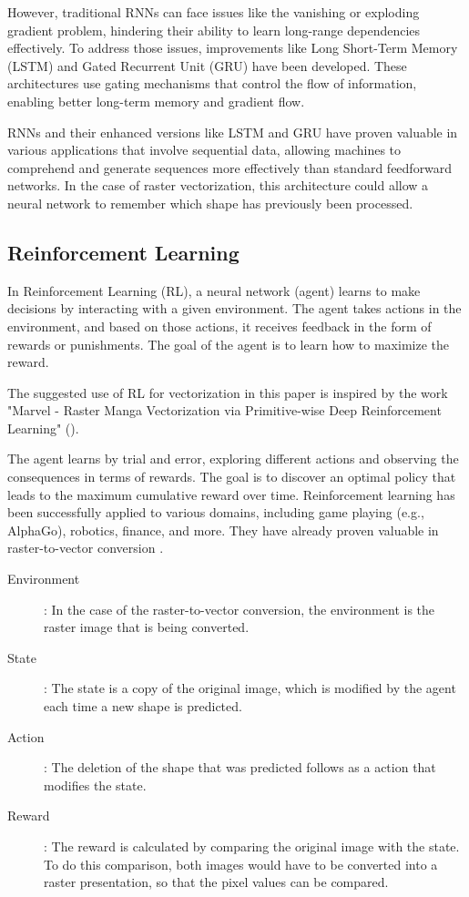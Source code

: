 \documentclass[12pt, a4paper, titlepage]{report}
\begin{document}
However, traditional RNNs can face issues like the vanishing or exploding gradient problem, hindering their ability to learn long-range dependencies effectively.
To address those issues, improvements like Long Short-Term Memory (LSTM) and Gated Recurrent Unit (GRU) have been developed. These architectures use gating mechanisms that control the flow of information, enabling better long-term memory and gradient flow.

RNNs and their enhanced versions like LSTM and GRU have proven valuable in various applications that involve sequential data, allowing machines to comprehend and generate sequences more effectively than standard feedforward networks. In the case of raster vectorization, this architecture could allow a neural network to remember which shape has previously been processed.

\subsection{Reinforcement Learning}

In Reinforcement Learning (RL), a neural network (agent) learns to make decisions by interacting with a given environment. The agent takes actions in the environment, and based on those actions, it receives feedback in the form of rewards or punishments. The goal of the agent is to learn how to maximize the reward.

The suggested use of RL for vectorization in this paper is inspired by the work "Marvel - Raster Manga Vectorization via Primitive-wise Deep Reinforcement Learning"  (\cite{su_marvel_2023}).

The agent learns by trial and error, exploring different actions and observing the consequences in terms of rewards. The goal is to discover an optimal policy that leads to the maximum cumulative reward over time. Reinforcement learning has been successfully applied to various domains, including game playing (e.g., AlphaGo), robotics, finance, and more. They have already proven valuable in raster-to-vector conversion \cite{su_marvel_2023}.

\begin{description}
   \item[Environment]: In the case of the raster-to-vector conversion, the environment is the raster image that is being converted.

   \item[State]: The state is a copy of the original image, which is modified by the agent each time a new shape is predicted.

   \item[Action]: The deletion of the shape that was predicted follows as a action that modifies the state.

   \item[Reward]: The reward is calculated by comparing the original image with the state. To do this comparison, both images would have to be converted into a raster presentation, so that the pixel values can be compared.
\end{description}
\end{document}
